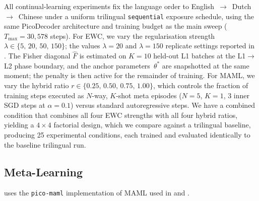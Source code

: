 All continual-learning experiments fix the language order to English~$\to$~Dutch~$\to$~Chinese under a uniform trilingual \texttt{sequential} exposure schedule, using the same PicoDecoder architecture and training budget as the main sweep ($T_{\max}\!=\!30{,}578$ steps). For EWC, we vary the regularisation strength $\lambda\!\in\!\{5,\,20,\,50,\,150\}$; the values $\lambda\!=\!20$ and $\lambda\!=\!150$ replicate settings reported in \citep{constantinescu2025investigating}.  The Fisher diagonal $\hat{F}$ is estimated on $K\!=\!10$ held-out L1 batches at the L1$\to$L2 phase boundary, and the anchor parameters~$\theta^*$ are snapshotted at the same moment; the penalty is then active for the remainder of training. For MAML, we vary the hybrid ratio $r\!\in\!\{0.25,\,0.50,\,0.75,\,1.00\}$, which controls the fraction of training steps executed as $N$-way, $K$-shot meta episodes ($N\!=\!5$, $K\!=\!1$, 3 inner SGD steps at $\alpha\!=\!0.1$) versus standard autoregressive steps. We have a combined condition that combines all four EWC strengths with all four hybrid ratios, yielding a $4\!\times\!4$ factorial design, which we compare against a trilingual baseline, producing 25 experimental conditions, each trained and evaluated identically to the baseline trilingual run.



\subsection{Meta-Learning}

\beetle{}  uses the \texttt{pico-maml} implementation of MAML used in \citet{africa-etal-2025-learning} and \citet{africa-etal-2025-meta}. 


